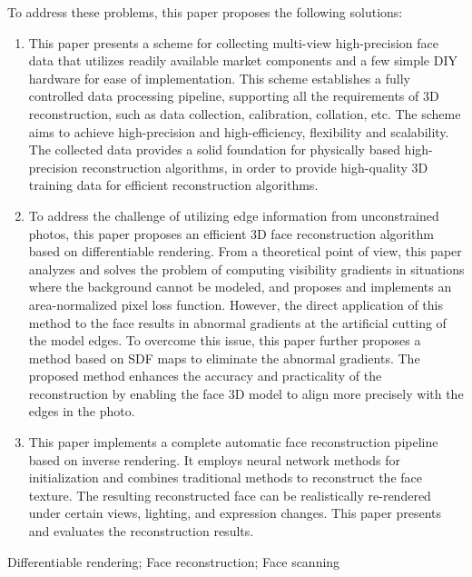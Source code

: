 \documentclass{scutmaster}
\begin{document}
To address these problems, this paper proposes the following solutions:
\begin{enumerate}
\item This paper presents a scheme for collecting multi-view high-precision face data
that utilizes readily available market components and a few simple DIY hardware for ease of implementation.
This scheme establishes a fully controlled data processing pipeline,
supporting all the requirements of 3D reconstruction, such as data collection, calibration, collation, etc.
The scheme aims to achieve high-precision and high-efficiency, flexibility and scalability.
The collected data provides a solid foundation for physically based high-precision reconstruction algorithms,
in order to provide high-quality 3D training data for efficient reconstruction algorithms.
\item To address the challenge of utilizing edge information from unconstrained photos,
this paper proposes an efficient 3D face reconstruction algorithm based on differentiable rendering.
From a theoretical point of view, this paper analyzes and solves the problem of computing visibility gradients in situations where the background cannot be modeled,
and proposes and implements an area-normalized pixel loss function.
However, the direct application of this method to the face results in abnormal gradients at the artificial cutting of the model edges.
To overcome this issue, this paper further proposes a method based on SDF maps to eliminate the abnormal gradients.
The proposed method enhances the accuracy and practicality of the reconstruction
by enabling the face 3D model to align more precisely with the edges in the photo.
\item This paper implements a complete automatic face reconstruction pipeline based on inverse rendering.
It employs neural network methods for initialization and combines traditional methods to reconstruct the face texture.
The resulting reconstructed face can be realistically re-rendered under certain views, lighting, and expression changes.
This paper presents and evaluates the reconstruction results.
\end{enumerate}

 Differentiable rendering; Face reconstruction; Face scanning

\tableofcontents

\listoffigures

\listoftables

\mainmatter

\end{document}
